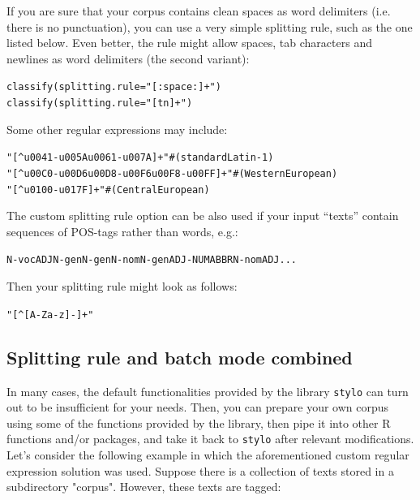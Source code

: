 \documentclass[11pt,a4paper]{article}
\def\code#1{{\tt #1}}
\begin{document}
If you are sure that your corpus contains clean spaces as word delimiters (i.e. there is no punctuation), you can use a very simple splitting rule, such as the one listed below. Even better, the rule might allow spaces, tab characters and newlines as word delimiters (the second variant):

\begin{alltt}
    classify(splitting.rule="[:space:]+")
    classify(splitting.rule="[ tn]+")
\end{alltt}

\noindent
Some other regular expressions may include:

\begin{alltt}
    "[\^{}u0041-{}u005Au0061-u007A]+"               # (standard Latin-1)
    "[\^{}u00C0-u00D6u00D8-u00F6u00F8-u00FF]+"  # (Western European)
    "[\^{}u0100-u017F]+"                            # (Central European)
\end{alltt}

\noindent
The custom splitting rule option can be also used if your input ``texts'' contain sequences of POS-tags rather than words, e.g.:

\begin{alltt}
    N-voc ADJ N-gen N-gen N-nom N-gen ADJ-NUM ABBR N-nom ADJ ...
\end{alltt}

\noindent
Then your splitting rule might look as follows:

\begin{alltt}
    "[\^{}[A-Za-z]-]+"
\end{alltt}




\subsection{Splitting rule and batch mode combined}

In many cases, the default functionalities provided by the library \code{stylo} can turn out to be insufficient for your needs. Then, you can prepare your own corpus using some of the functions provided by the library, then pipe it into other R functions and/or packages, and take it back to \code{stylo} after relevant modifications. Let's consider the following example in which the aforementioned custom regular expression solution was used. Suppose there is a collection of texts stored in a subdirectory "corpus". However, these texts are tagged:
\end{document}
